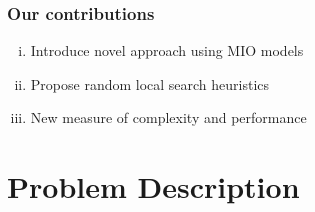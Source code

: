 \documentclass{beamer}
\begin{document}
\begin{frame}
\frametitle{Our contributions}
\begin{enumerate}[(i)]
\item Introduce novel approach using MIO models
\item Propose random local search heuristics
\item New measure of complexity and performance
\end{enumerate}
\end{frame}

\section{Problem Description}


\end{document}
